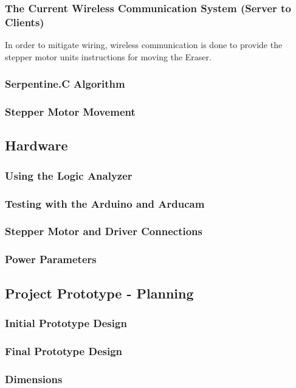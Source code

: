 \subsubsection{The Current Wireless Communication System (Server to Clients)}
In order to mitigate wiring, wireless communication is done to provide the stepper motor units instructions for moving the Eraser. 

\subsubsection{Serpentine.C Algorithm}
\subsubsection{Stepper Motor Movement}
\subsection{Hardware}
\subsubsection{Using the Logic Analyzer}
\subsubsection{Testing with the Arduino and Arducam}
\subsubsection{Stepper Motor and Driver Connections}
\subsubsection{Power Parameters}
\subsection{Project Prototype - Planning}
\subsubsection{Initial Prototype Design}
\subsubsection{Final Prototype Design}
\subsubsection{Dimensions}
